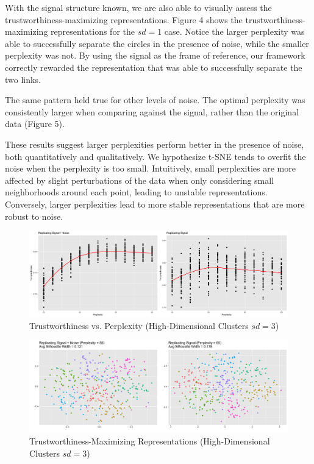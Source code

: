 \documentclass{article}
\begin{document}
With the signal structure known, we are also able to visually assess the trustworthiness-maximizing representations. Figure 4 shows the trustworthiness-maximizing representations for the $sd = 1$ case. Notice the larger perplexity was able to successfully separate the circles in the presence of noise, while the smaller perplexity was not. By using the signal as the frame of reference, our framework correctly rewarded the representation that was able to successfully separate the two links.

The same pattern held true for other levels of noise. The optimal perplexity was consistently larger when comparing against the signal, rather than the original data (Figure 5).

These results suggest larger perplexities perform better in the presence of noise, both quantitatively and qualitatively. We hypothesize t-SNE tends to overfit the noise when the perplexity is too small. Intuitively, small perplexities are more affected by slight perturbations of the data when only considering small neighborhoods around each point, leading to unstable representations. Conversely, larger perplexities lead to more stable representations that are more robust to noise.

\renewcommand{\thefigure}{6}
\begin{figure}[b]
\centering
\includegraphics[scale=0.22]{trust_plot_high_dim}
\caption{Trustworthiness vs. Perplexity (High-Dimensional Clusters $sd = 3$)}
\end{figure}

\renewcommand{\thefigure}{7}
\begin{figure}[t]
\centering
\includegraphics[scale=0.14]{best_rep_high_dim}
\caption{Trustworthiness-Maximizing Representations (High-Dimensional Clusters $sd = 3$)}
\end{figure}
\end{document}
